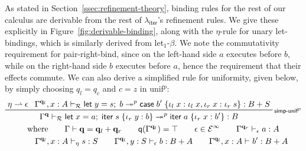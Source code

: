 \documentclass[acmsmall,screen,review]{acmart}
\newcommand{\mc}[1]{\ensuremath{\mathcal{#1}}}
\newcommand{\mb}[1]{\ensuremath{\mathbf{#1}}}
\newcommand{\ms}[1]{\ensuremath{\mathsf{#1}}}
\newcommand{\lto}{:}
\newcommand{\linl}[1]{\iota_l\;{#1}}
\newcommand{\linr}[1]{\iota_r\;{#1}}
\newcommand{\letexpr}[3]{\ensuremath{\ms{let}\;#1 = #2;\;#3}}
\newcommand{\caseexpr}[5]{\ms{case}\;#1\;\{\linl{#2} \lto #3, \linr{#4} \lto #5\}}
\newcommand{\liter}[3]{\ms{iter}\;#1\;\{ \linr{#2} \lto #3 \}}
\newcommand{\einf}[1]{#1 \in \mc{E}^\infty}
\newcommand{\qsp}[4]{#1 \vdash #2 = #3 + #4}
\newcommand{\rle}[1]{{\scriptsize\textsf{#1}}}
\newcommand{\hasty}[4]{#1 \vdash_{#2} #3: {#4}}
\newcommand{\tref}{\twoheadrightarrow}
\newcommand{\tmlep}[6]{#1 \vdash_{#2} #3 \tref^{#6} #4 : {#5}}
\newcommand{\brle}[1]{{\textsf{#1}}}
\newcommand{\subiterexp}{\texorpdfstring{\(\lambda_{\ms{iter}}\)}{lambda-iter}}
\newcommand{\rightmove}{\rightharpoonup}
\newcommand{\alquant}{\ms{q}}
\begin{document}
As stated in Section~\ref{ssec:refinement-theory}, binding rules for the rest of our calculus are
derivable from the rest of \subiterexp{}'s refinement rules. We give these explicitly in
Figure~\ref{fig:derivable-binding}, along with the $\eta$-rule for unary let-bindings, which is
similarly derived from \brle{let$_1$-$\beta$}. We note the commutativity requirement for
\brle{pair-right-bind}, since on the left-hand side $a$ executes before $b$, while on the right-hand
side $b$ executes before $a$, hence the requirement that their effects commute. We can also derive a
simplified rule for uniformity, given below, by simply choosing $q_l = q_c$ and $c = z$ in
\brle{unif$^p$}:
  \begin{gather*}
    \prftree[r]{\rle{simp-unif$^p$}}
      {\eta \rightmove \epsilon}
      {\tmlep{\Gamma^{\mb{q}_l}, x : A}{\mc{R}}
        {\letexpr{y}{s}{b}}
        {\caseexpr{b'}{x}{\linl{x}}{x}{\linr{s}}}{B + S}{p}}
      {
        \tmlep{\Gamma^{\mb{q}}}
          {\mc{R}}
          {\letexpr{x}{a}{\liter{s}{y}{b}}}
          {\liter{a}{x}{b'}}
          {B}
          {p}
      } \\
    \text{where} \qquad {\qsp{\Gamma}{\mb{q}}{\mb{q}_l}{\mb{q}_r}} \qquad
    \alquant(\Gamma^{\mb{q}_l}) = \top \qquad
    \einf{\epsilon} \qquad {\hasty{\Gamma^{\mb{q}_r}}{\epsilon}{a}{A}}
    \\
    \qquad {\hasty{\Gamma^{\mb{q}_l}, x : A}{\eta}{s}{S}}
    \qquad {\hasty{\Gamma^{\mb{q}_l}, y : S}{\epsilon}{b}{B + A}}
    \qquad {\hasty{\Gamma^{\mb{q}_l}, x : A}{}{b'}{B + A}}
  \end{gather*}
\end{document}
